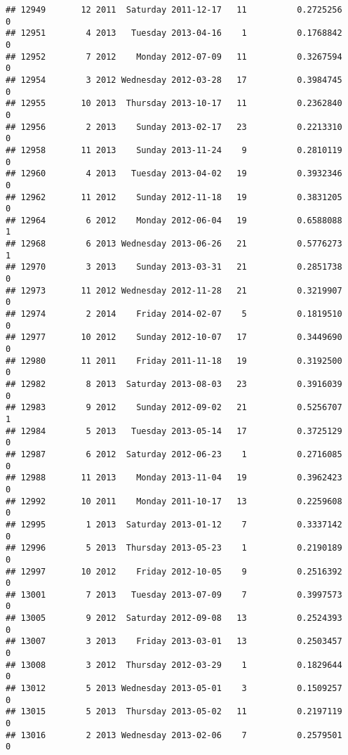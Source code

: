 \documentclass[
]{article}
\begin{document}
\begin{verbatim}
## 12949       12 2011  Saturday 2011-12-17   11          0.2725256             0
## 12951        4 2013   Tuesday 2013-04-16    1          0.1768842             0
## 12952        7 2012    Monday 2012-07-09   11          0.3267594             0
## 12954        3 2012 Wednesday 2012-03-28   17          0.3984745             0
## 12955       10 2013  Thursday 2013-10-17   11          0.2362840             0
## 12956        2 2013    Sunday 2013-02-17   23          0.2213310             0
## 12958       11 2013    Sunday 2013-11-24    9          0.2810119             0
## 12960        4 2013   Tuesday 2013-04-02   19          0.3932346             0
## 12962       11 2012    Sunday 2012-11-18   19          0.3831205             0
## 12964        6 2012    Monday 2012-06-04   19          0.6588088             1
## 12968        6 2013 Wednesday 2013-06-26   21          0.5776273             1
## 12970        3 2013    Sunday 2013-03-31   21          0.2851738             0
## 12973       11 2012 Wednesday 2012-11-28   21          0.3219907             0
## 12974        2 2014    Friday 2014-02-07    5          0.1819510             0
## 12977       10 2012    Sunday 2012-10-07   17          0.3449690             0
## 12980       11 2011    Friday 2011-11-18   19          0.3192500             0
## 12982        8 2013  Saturday 2013-08-03   23          0.3916039             0
## 12983        9 2012    Sunday 2012-09-02   21          0.5256707             1
## 12984        5 2013   Tuesday 2013-05-14   17          0.3725129             0
## 12987        6 2012  Saturday 2012-06-23    1          0.2716085             0
## 12988       11 2013    Monday 2013-11-04   19          0.3962423             0
## 12992       10 2011    Monday 2011-10-17   13          0.2259608             0
## 12995        1 2013  Saturday 2013-01-12    7          0.3337142             0
## 12996        5 2013  Thursday 2013-05-23    1          0.2190189             0
## 12997       10 2012    Friday 2012-10-05    9          0.2516392             0
## 13001        7 2013   Tuesday 2013-07-09    7          0.3997573             0
## 13005        9 2012  Saturday 2012-09-08   13          0.2524393             0
## 13007        3 2013    Friday 2013-03-01   13          0.2503457             0
## 13008        3 2012  Thursday 2012-03-29    1          0.1829644             0
## 13012        5 2013 Wednesday 2013-05-01    3          0.1509257             0
## 13015        5 2013  Thursday 2013-05-02   11          0.2197119             0
## 13016        2 2013 Wednesday 2013-02-06    7          0.2579501             0

\end{verbatim}
\end{document}
